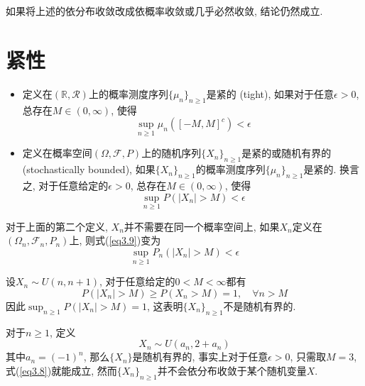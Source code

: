 \documentclass[cn, 12pt, math=mtpro2, bibstyle=apa, blue, twocol]{elegantbook}
\newcommand{\F}{\mathcal{F}}
\newcommand{\R}{\mathbb{R}}
\begin{document}
\begin{remark}
如果将上述的依分布收敛改成依概率收敛或几乎必然收敛, 结论仍然成立.
\end{remark}
\section{紧性}
\begin{definition}
\begin{itemize}
\item 定义在$(\R,\mathcal{R})$上的概率测度序列$\{\mu_n\}_{n\ge1}$是紧的 (tight), 如果对于任意$\epsilon>0$, 总存在$M\in(0,\infty)$, 使得
\begin{equation}\label{eq3.8}
  \sup_{n\ge1}\mu_n([-M,M]^c)<\epsilon
\end{equation}

\item 定义在概率空间$(\Omega,\F,P)$上的随机序列$\{X_n\}_{n\ge1}$是紧的或随机有界的 (stochastically bounded), 如果$\{X_n\}_{n\ge1}$的概率测度序列$\{\mu_n\}_{n\ge1}$是紧的. 换言之, 对于任意给定的$\epsilon>0$, 总存在$M\in(0,\infty)$, 使得
\begin{equation}\label{eq3.9}
  \sup_{n\ge1}P(|X_n|>M)<\epsilon
\end{equation}
\end{itemize}
\end{definition}
\begin{remark}
对于上面的第二个定义, $X_n$并不需要在同一个概率空间上, 如果$X_n$定义在$(\Omega_n,\F_n,P_n)$上, 则式(\ref{eq3.9})变为
$$\sup_{n\ge1} P_n(|X_n|>M)<\epsilon$$
\end{remark}

\begin{example}
设$X_n\sim U(n,n+1)$, 对于任意给定的$0<M<\infty$都有
$$P(|X_n|>M)\geq P(X_n>M)=1,\quad\forall n>M$$
因此$\sup_{n\geq1}P(|X_n|>M)=1$, 这表明$\{X_n\}_{n\ge1}$不是随机有界的.
\end{example}

\begin{example}
对于$n\ge1$, 定义
\begin{equation}\label{eq3.10}
  X_n\sim U(a_n,2+a_n)
\end{equation}
其中$a_n=(-1)^n$, 那么$\{X_n\}$是随机有界的, 事实上对于任意$\epsilon>0$, 只需取$M=3$, 式(\ref{eq3.8})就能成立, 然而$\{X_n\}_{n\ge1}$并不会依分布收敛于某个随机变量$X$.
\end{example}
\end{document}
